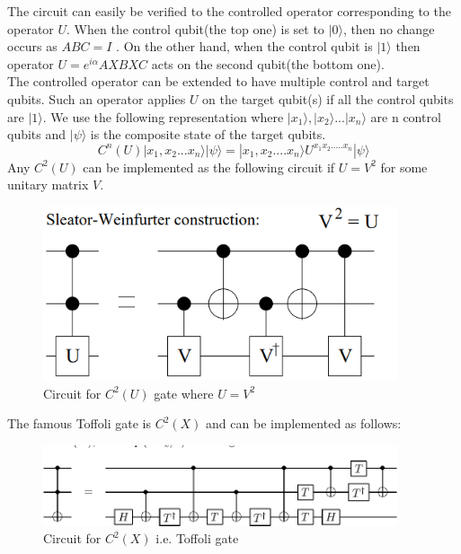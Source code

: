 The circuit can easily be verified to the controlled operator corresponding to the operator $U$. When the control qubit(the top one) is set to $|0\rangle$, then no change occurs as $ABC = I$ .  On the other hand, when the control qubit is $|1\rangle$ then operator $U = e^{i\alpha} AXBXC$ acts on the second qubit(the bottom one).\\
The controlled operator can be extended to have multiple control and target qubits. Such an operator applies $U$ on the target qubit(s) if all the control qubits are $|1\rangle$. We use the following representation where $|x_1\rangle,|x_2\rangle...|x_n\rangle$ are n control qubits and $|\psi\rangle$ is the composite state of the target qubits.
\begin{equation}
C^n(U)|x_1,x_2...x_n\rangle|\psi \rangle = |x_1,x_2....x_n\rangle U^{x_1x_2.....x_n}|\psi\rangle
\end{equation}Any $C^2(U)$ can be implemented as the following circuit if $U = V^2$ for some unitary matrix $V$. 
\begin{figure}[h]
\centering
\includegraphics[width=0.93\textwidth]{images/c2.png}\par
\label{cU}
\caption{Circuit for $C^2(U)$ gate where $U = V^2$}
\end{figure}
\newline
The famous Toffoli gate is $C^2(X)$ and can be implemented as follows:
\begin{figure}[h]
\centering
\includegraphics[width=0.93\textwidth]{images/toffoli.png}\par
\label{toffoli}
\caption{Circuit for $C^2(X)$ i.e. Toffoli gate }
\end{figure}
